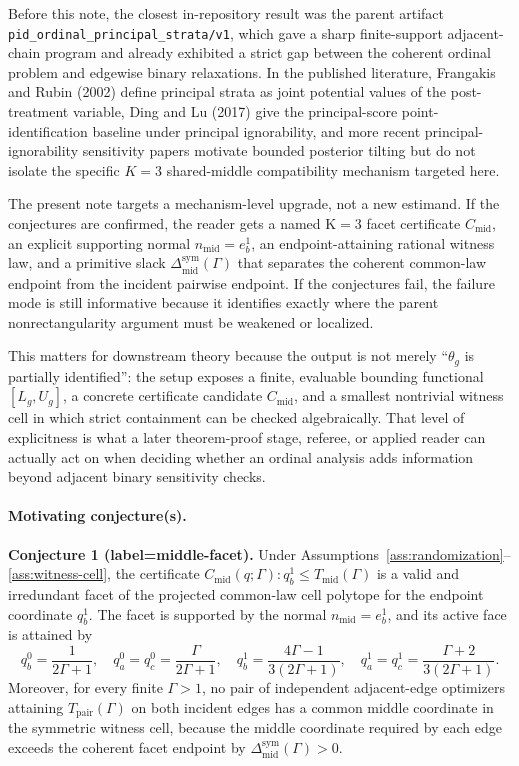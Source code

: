 \documentclass[11pt]{article}
\theoremstyle{definition}
\theoremstyle{plain}
\theoremstyle{remark}
\begin{document}
Before this note, the closest in-repository result was the parent artifact \texttt{pid\_ordinal\_principal\_strata/v1}, which gave a sharp finite-support adjacent-chain program and already exhibited a strict gap between the coherent ordinal problem and edgewise binary relaxations.  In the published literature, Frangakis and Rubin (2002) define principal strata as joint potential values of the post-treatment variable, Ding and Lu (2017) give the principal-score point-identification baseline under principal ignorability, and more recent principal-ignorability sensitivity papers motivate bounded posterior tilting but do not isolate the specific \(K=3\) shared-middle compatibility mechanism targeted here.

The present note targets a mechanism-level upgrade, not a new estimand.  If the conjectures are confirmed, the reader gets a named K\(=3\) facet certificate \(C_{\mathrm{mid}}\), an explicit supporting normal \(n_{\mathrm{mid}}=e_b^1\), an endpoint-attaining rational witness law, and a primitive slack \(\Delta_{\mathrm{mid}}^{\mathrm{sym}}(\Gamma)\) that separates the coherent common-law endpoint from the incident pairwise endpoint.  If the conjectures fail, the failure mode is still informative because it identifies exactly where the parent nonrectangularity argument must be weakened or localized.

This matters for downstream theory because the output is not merely ``\(\theta_g\) is partially identified'': the setup exposes a finite, evaluable bounding functional \([L_g,U_g]\), a concrete certificate candidate \(C_{\mathrm{mid}}\), and a smallest nontrivial witness cell in which strict containment can be checked algebraically.  That level of explicitness is what a later theorem-proof stage, referee, or applied reader can actually act on when deciding whether an ordinal analysis adds information beyond adjacent binary sensitivity checks.

\paragraph{Motivating conjecture(s).}
\textbf{Conjecture 1 (label=middle-facet).} Under Assumptions~\ref{ass:randomization}--\ref{ass:witness-cell}, the certificate \(C_{\mathrm{mid}}(q;\Gamma):q_b^1\le T_{\mathrm{mid}}(\Gamma)\) is a valid and irredundant facet of the projected common-law cell polytope for the endpoint coordinate \(q_b^1\).  The facet is supported by the normal \(n_{\mathrm{mid}}=e_b^1\), and its active face is attained by
\[
  q_b^0=\frac{1}{2\Gamma+1},\quad
  q_a^0=q_c^0=\frac{\Gamma}{2\Gamma+1},\quad
  q_b^1=\frac{4\Gamma-1}{3(2\Gamma+1)},\quad
  q_a^1=q_c^1=\frac{\Gamma+2}{3(2\Gamma+1)}.
\]
Moreover, for every finite \(\Gamma>1\), no pair of independent adjacent-edge optimizers attaining \(T_{\mathrm{pair}}(\Gamma)\) on both incident edges has a common middle coordinate in the symmetric witness cell, because the middle coordinate required by each edge exceeds the coherent facet endpoint by \(\Delta_{\mathrm{mid}}^{\mathrm{sym}}(\Gamma)>0\).
\end{document}
